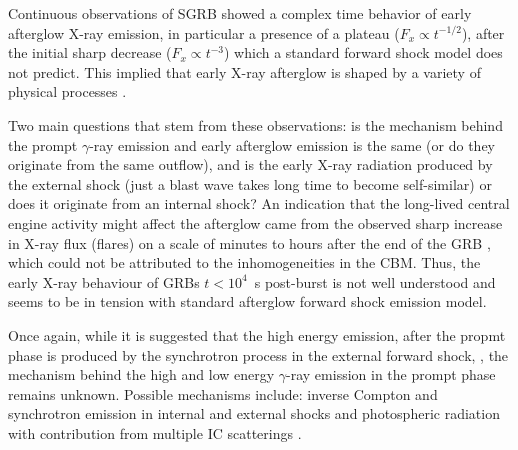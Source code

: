 Continuous observations of \ac{SGRB} showed a complex time behavior of early afterglow X-ray emission, in particular a presence of a plateau ($F_{x}\propto t^{-1/2}$), after the initial sharp decrease ($F_{x}\propto t^{-3}$) which a standard forward shock model does not predict. This implied that early X-ray afterglow is shaped by a variety of physical processes \citep{Zhang:2005fa}.

Two main questions that stem from these observations: is the mechanism behind the prompt $\gamma$-ray emission and early afterglow emission is the same (or do they originate from the same outflow), and is the early X-ray radiation produced by the external shock (just a blast wave takes long time to become self-similar) or does it originate from an internal shock?
An indication that the long-lived central engine activity might affect the afterglow came from the observed sharp increase in X-ray flux (flares) on a scale of minutes to hours after the end of the \ac{GRB}
\citep{Burrows:2005ww,Chincarini:2007fp,Chincarini:2010,Margutti:2011}, which could not be attributed to the inhomogeneities in the \ac{CBM}.
Thus, the early X-ray behaviour of \acp{GRB} $t < 10^{4}$~s post-burst is not well understood and seems to be in tension with standard afterglow forward shock emission model.


Once again, while it is suggested that the high energy emission, after the propmt phase is produced by the synchrotron process in the external forward shock, \citep{Kumar:2009,Ghisellini:2010}, the mechanism behind the high and low energy $\gamma$-ray emission in the prompt phase remains unknown. 
Possible mechanisms include: inverse Compton and synchrotron emission in internal and external shocks
\citep[\eg][]{Rees:1992ek,Dermer:1998py,Lyutikov:2003ih,Zhang:2011} and 
photospheric radiation with contribution from multiple \ac{IC} scatterings
\citep[\eg][]{Thompson:1994zh,Ghisellini:1998jy,Meszaros:1999gb,Peer:2005qoc,Peer:2008udu,Giannios:2006jb,Ioka:2007qk,Asano:2009gi,Lazzati:2010,Beloborodov:2010,Toma:2011}.



